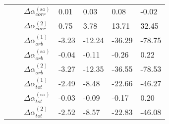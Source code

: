 \begin{longtable}{lllllll}
      &         & $\Delta \alpha_{corr}^{(\text{so})}$ &           0.01 &      0.03 &            0.08 &     -0.02 \\
      &         & $\Delta \alpha_{corr}^{(\text{2})}$ &           0.75 &      3.78 &           13.71 &     32.45 \\
      &         & $\Delta \alpha_{orb}^{(\text{1})}$ &          -3.23 &    -12.24 &          -36.29 &    -78.75 \\
      &         & $\Delta \alpha_{orb}^{(\text{so})}$ &          -0.04 &     -0.11 &           -0.26 &      0.22 \\
      &         & $\Delta \alpha_{orb}^{(\text{2})}$ &          -3.27 &    -12.35 &          -36.55 &    -78.53 \\
      &         & $\Delta \alpha_{tot}^{(\text{1})}$ &          -2.49 &     -8.48 &          -22.66 &    -46.27 \\
      &         & $\Delta \alpha_{tot}^{(\text{so})}$ &          -0.03 &     -0.09 &           -0.17 &      0.20 \\
      &         & $\Delta \alpha_{tot}^{(\text{2})}$ &          -2.52 &     -8.57 &          -22.83 &    -46.08 \\
\end{longtable}
